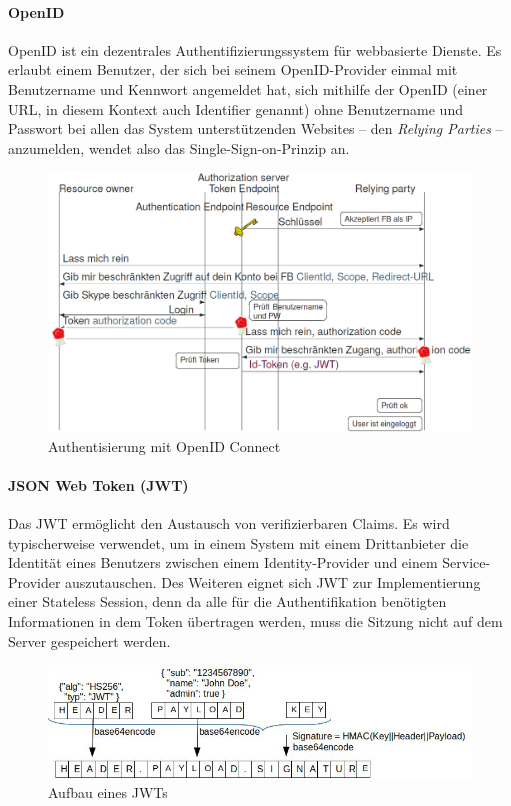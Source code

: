 \documentclass[10pt,a4paper]{article}
\begin{document}
\paragraph*{OpenID}OpenID ist ein dezentrales Authentifizierungssystem für webbasierte Dienste. Es erlaubt einem Benutzer, der sich bei seinem OpenID-Provider einmal mit Benutzername und Kennwort angemeldet hat, sich mithilfe der OpenID (einer URL, in diesem Kontext auch Identifier genannt) ohne Benutzername und Passwort bei allen das System unterstützenden Websites – den \textsl{Relying Parties} – anzumelden, wendet also das Single-Sign-on-Prinzip an.\cite{wiki}
\begin{figure}[H]
    \begin{center}
    \includegraphics[width=12cm]{images/openid.png}
    \caption{Authentisierung mit OpenID Connect}
    \label{openid}
    \end{center}
\end{figure}

\paragraph*{JSON Web Token (JWT)}Das JWT ermöglicht den Austausch von verifizierbaren Claims. Es wird typischerweise verwendet, um in einem System mit einem Drittanbieter die Identität eines Benutzers zwischen einem Identity-Provider und einem Service-Provider auszutauschen. Des Weiteren eignet sich JWT zur Implementierung einer Stateless Session, denn da alle für die Authentifikation benötigten Informationen in dem Token übertragen werden, muss die Sitzung nicht auf dem Server gespeichert werden.\cite{wiki}
\begin{figure}[H]
    \begin{center}
    \includegraphics[width=12cm]{images/jwt.png}
    \caption{Aufbau eines JWTs}
    \label{jwt}
    \end{center}
\end{figure}
\end{document}
